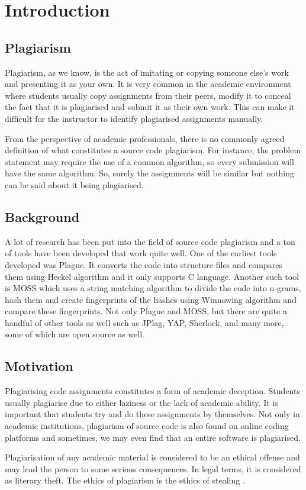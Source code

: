 \documentclass[12pt]{article}
\begin{document}
\pagebreak

\section{Introduction}
\subsection{Plagiarism}
Plagiarism, as we know, is the act of imitating or copying someone else's work and presenting it as your own. \cite{plagiarism}  It is very common in the academic environment where students usually copy assignments from their peers, modify it to conceal the fact that it is plagiarised and submit it as their own work. This can make it difficult for the instructor to identify plagiarised assignments manually. \par
From the perspective of academic professionals, there is no commonly agreed definition of what constitutes a source code plagiarism. For instance, the problem statement may require the use of a common algorithm, so every submission will have the same algorithm. So, surely the assignments will be similar but nothing can be said about it being plagiarised. \par

\subsection{Background}
A lot of research has been put into the field of source code plagiarism and a ton of tools have been developed that work quite well. One of the earliest tools developed was Plague. It converts the code into structure files and compares them using Heckel algorithm and it only supports C language. Another such tool is MOSS which uses a string matching algorithm to divide the code into n-grams, hash them and create fingerprints of the hashes using Winnowing algorithm and compare these fingerprints. Not only Plague and MOSS, but there are quite a handful of other tools as well such as JPlag, YAP, Sherlock, and many more, some of which are open source as well.


\subsection{Motivation}
Plagiarising code assignments constitutes a form of academic deception. Students usually plagiarise due to either laziness or the lack of academic ability. It is important that students try and do these assignments by themselves. Not only in academic institutions, plagiarism of source code is also found on online coding platforms and sometimes, we may even find that an entire software is plagiarised. \par
Plagiarisation of any academic material is considered to be an ethical offense and may lead the person to some serious consequences. In legal terms, it is considered as literary theft. The ethics of plagiarism is the ethics of stealing  \cite{ethicplag}.
\end{document}
